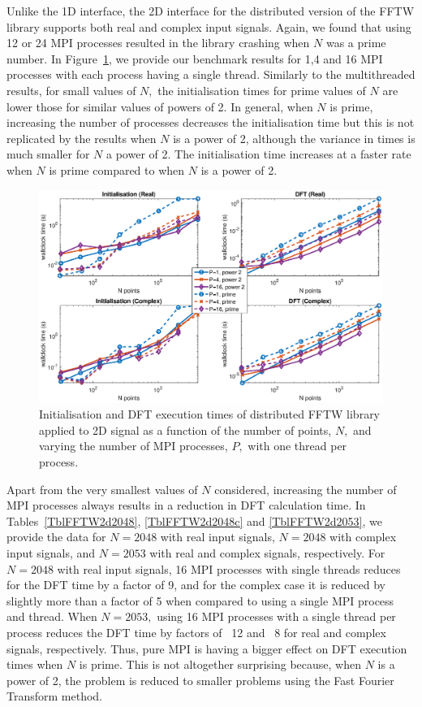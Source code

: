 \documentclass[a4paper]{article}
\begin{document}
Unlike the 1D interface, the 2D interface for the distributed version
of the FFTW library supports both real and complex input
signals. Again, we found that using 12 or 24 MPI processes resulted in
the library crashing when $N$ was a prime number. In
Figure~\ref{2DDistFFTW}, we provide our benchmark results for 1,4 and
16 MPI processes with each process having a single thread. Similarly
to the multithreaded results, for small values of $N,$ the
initialisation times for prime values of $N$ are lower those for
similar values of powers of 2. In general, when $N$ is prime,
increasing the number of processes decreases the initialisation time
but this is not replicated by the results when $N$ is a power of 2,
although the variance in times is much smaller for $N$ a power of
2. The initialisation time increases at a faster rate when $N$ is
prime compared to when $N$ is a power of 2.


\begin{figure}[htb]
    \centering
    \includegraphics[width=0.9\linewidth]{../results/fftw_2d_mpi.eps}
  \caption{Initialisation and DFT execution times of distributed FFTW library applied to 2D signal as a function of the
    number of points, $N,$ and varying the number of MPI processes, $P,$ with one thread per process.}
  \label{2DDistFFTW}
\end{figure}

Apart from the very smallest values of $N$ considered, increasing the
number of MPI processes always results in a reduction in DFT
calculation time. In Tables~\ref{TblFFTW2d2048},
\ref{TblFFTW2d2048c} and \ref{TblFFTW2d2053}, we provide the data
for $N=2048$ with real input signals, $N=2048$ with complex input
signals, and $N=2053$ with real and complex signals, respectively. For
$N=2048$ with real input signals, 16 MPI processes with single threads
reduces for the DFT time by a factor of 9, and for the complex case it
is reduced by slightly more than a factor of 5 when compared to using
a single MPI process and thread. When $N=2053,$ using 16 MPI processes
with a single thread per process reduces the DFT time by factors of
~12 and ~8 for real and complex signals, respectively. Thus, pure MPI
is having a bigger effect on DFT execution times when $N$ is
prime. This is not altogether surprising because, when $N$ is a power
of 2, the problem is reduced to smaller problems using the Fast
Fourier Transform method.
\end{document}
